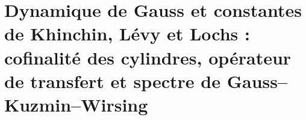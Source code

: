 \chapter{Dynamique de Gauss et constantes de Khinchin, Lévy et Lochs : cofinalité des cylindres, opérateur de transfert et spectre de Gauss--Kuzmin--Wirsing}
\label{chap:p3-final:44:gauss_khinchin_levy_lochs}



